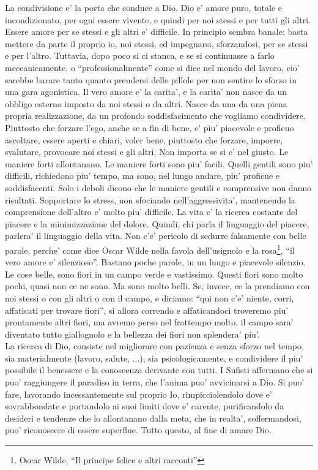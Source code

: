La condivisione e' la porta che conduce a Dio. Dio e' amore puro, totale e incondizionato, per ogni essere vivente, e quindi per noi stessi e per tutti gli altri.
Essere amore per se stessi e gli altri e' difficile. In principio sembra banale: basta mettere da parte il proprio io, noi stessi, ed impegnarsi, sforzandosi, per se stessi e per l'altro. Tuttavia, dopo poco si ci stanca, e se si continuasse a farlo meccanicamente, o ``professionalmente'' come si dice nel mondo del lavoro, cio' sarebbe barare tanto quanto prendersi delle pillole per non sentire lo sforzo in una gara agonistica.
Il vero amore e' la carita', e la carita' non nasce da un obbligo esterno imposto da noi stessi o da altri. Nasce da una da una piena propria realizzazione, da un profondo soddisfacimento che vogliamo condividere.
Piuttosto che forzare l'ego, anche se a fin di bene, e' piu' piacevole e proficuo ascoltare, essere aperti e chiari, voler bene, piuttosto che forzare, imporre, svalutare, provocare noi stessi e gli altri. Non importa se si e' nel giusto. Le maniere forti allontanano.
Le maniere forti sono piu' facili. Quelli gentili sono piu' difficili, richiedono piu' tempo, ma sono, nel lungo andare, piu' proficue e soddisfacenti. Solo i deboli dicono che le maniere gentili e comprensive non danno risultati. Sopportare lo stress, non sfociando nell'aggressivita', mantenendo la comprensione dell'altro e' molto piu' difficile. 
La vita e' la ricerca costante del piacere e la minimizzazione del dolore. Quindi, chi parla il linguaggio del piacere, parlera' il linguaggio della vita. Non c'e' pericolo di sedurre falsamente con belle parole, perche' come dice Oscar Wilde nella favola dell'usignolo e la rosa\footnote{Oscar Wilde, ``Il principe felice e altri racconti''}, ``il vero amore e' silenzioso''. Bastano poche parole, in un lungo e piacevole silenzio.
Le cose belle, sono fiori in un campo verde e vastissimo. Questi fiori sono molto pochi, quasi non ce ne sono. Ma sono molto belli. Se, invece, ce la prendiamo con noi stessi o con gli altri o con il campo, e diciamo: ``qui non c'e' niente, corri, affaticati per trovare fiori'', si allora correndo e affaticandoci troveremo piu' prontamente altri fiori, ma avremo perso nel frattempo molto, il campo sara' diventato tutto giallognolo e la bellezza dei fiori non splendera' piu'.\\
La ricerca di Dio, consiste nel migliorare con pazienza e senza sforzo nel tempo, sia materialmente (lavoro, salute, ...), sia psicologicamente, e condividere il piu' possibile il benessere e la conoscenza derivante con tutti. I Sufisti affermano che si puo' raggiungere il paradiso in terra, che l'anima puo' avvicinarsi a Dio. Si puo' fare, lavorando incessantemente sul proprio Io, rimpicciolendolo dove e' sovrabbondate e portandolo ai suoi limiti dove e' carente, purificandolo da desideri e tendenze che lo allontanano dalla meta, che in realta', soffermandosi, puo' riconoscere di essere superflue. Tutto questo, al fine di amare Dio. \\
